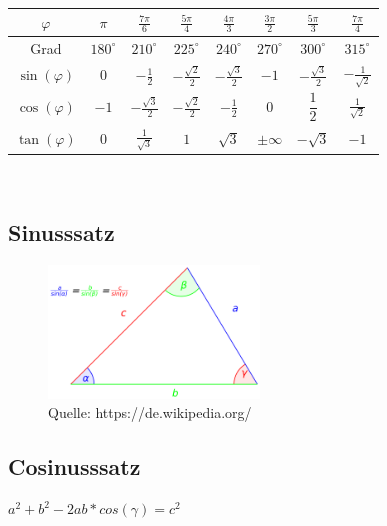 \begin{tabular}{|c|c|c|c|c|c|c|c|}
	\hline
	\(\varphi \) &$\pi$ & \(\frac{7\pi}{6}\) & \(\frac{5\pi}{4}\) & \(\frac{4\pi}{3}\) &  \(\frac{3\pi}{2}\) &  \(\frac{5\pi}{3}\) &  \(\frac{7\pi}{4}\)  \\
	\hline
	Grad & $180^\circ$ & $210^\circ$ & $225^\circ$ & $240^\circ$ & $270^\circ$ & $ 300^\circ$ & $315^\circ$\\
	\hline
	\(\sin(\varphi)\) & $0$ & \(-\frac{1}{2}\) & \(-\frac{\sqrt{2}}{2}\) & \(-\frac{\sqrt{3}}{2}\) & $-1$ &  \(-\frac{\sqrt{3}}{2}\) &  \(-\frac{1}{\sqrt{2}}\)  \\
	\hline
	\(\cos(\varphi)\) &$-1$ & \(-\frac{\sqrt{3}}{2}\) & \(-\frac{\sqrt{2}}{2}\) & \(-\frac{1}{2}\) & $0$ & $\dfrac{1}{2}$ & \(\frac{1}{\sqrt{2}}\)  \\
	\hline
	\(\tan(\varphi)\) &$ 0$ & \(\frac{1}{\sqrt{3}}\) &  $1$ & $\sqrt{3}$ & $\pm \infty$ &$-\sqrt{3}$ & $-1$ \\ 
	\hline
\end{tabular}\\
\renewcommand{\arraystretch}{1.0}

\newpage
\subsection{Sinusssatz}
\begin{figure}[h!]
\centering
    \includegraphics[width=0.5\textwidth]{images/sinussatz.png}
    \caption{Quelle: https://de.wikipedia.org/}
    
\end{figure}
\subsection{Cosinusssatz}
$a^2 + b^2 -2ab*cos(\gamma)= c^2$


